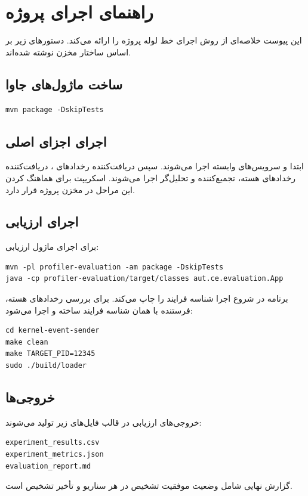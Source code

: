 \chapter{راهنمای اجرای پروژه}

این پیوست خلاصه‌ای از روش اجرای خط لوله پروژه را ارائه می‌کند. دستورهای زیر بر اساس ساختار مخزن  نوشته شده‌اند.

\section{ساخت ماژول‌های جاوا}
\begin{latin}
\begin{verbatim}
mvn package -DskipTests
\end{verbatim}
\end{latin}

\section{اجرای اجزای اصلی}
ابتدا  و سرویس‌های وابسته اجرا می‌شوند. سپس دریافت‌کننده رخدادهای ، دریافت‌کننده رخدادهای هسته، تجمیع‌کننده و تحلیل‌گر اجرا می‌شوند. اسکریپت  برای هماهنگ کردن این مراحل در مخزن پروژه قرار دارد.

\section{اجرای ارزیابی}
برای اجرای ماژول ارزیابی:
\begin{latin}
\begin{verbatim}
mvn -pl profiler-evaluation -am package -DskipTests
java -cp profiler-evaluation/target/classes aut.ce.evaluation.App
\end{verbatim}
\end{latin}

برنامه در شروع اجرا شناسه فرایند را چاپ می‌کند. برای بررسی رخدادهای هسته، فرستنده  با همان شناسه فرایند ساخته و اجرا می‌شود:
\begin{latin}
\begin{verbatim}
cd kernel-event-sender
make clean
make TARGET_PID=12345
sudo ./build/loader
\end{verbatim}
\end{latin}

\section{خروجی‌ها}
خروجی‌های ارزیابی در قالب فایل‌های زیر تولید می‌شوند:
\begin{latin}
\begin{verbatim}
experiment_results.csv
experiment_metrics.json
evaluation_report.md
\end{verbatim}
\end{latin}

گزارش نهایی شامل وضعیت موفقیت تشخیص در هر سناریو و تأخیر تشخیص است.
